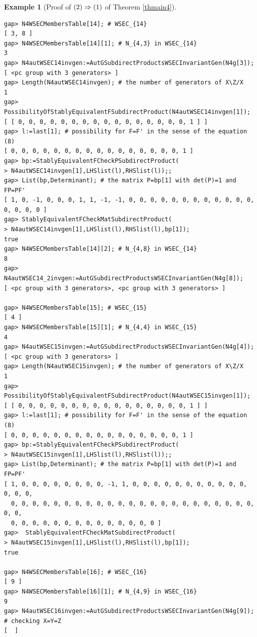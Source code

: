 \documentclass{amsart}
\theoremstyle{plain}
\theoremstyle{definition}
\newtheorem{example}[theorem]{Example}
\theoremstyle{remark}
\begin{document}
\begin{example}[Proof of ${\rm (2)}\Rightarrow {\rm (1)}$ of {Theorem \ref{thmain4}}]
\begin{verbatim}
gap> N4WSECMembersTable[14]; # WSEC_{14}
[ 3, 8 ]
gap> N4WSECMembersTable[14][1]; # N_{4,3} in WSEC_{14}
3
gap> N4autWSEC14invgen:=AutGSubdirectProductsWSECInvariantGen(N4g[3]);
[ <pc group with 3 generators> ]
gap> Length(N4autWSEC14invgen); # the number of generators of X\Z/X
1
gap> PossibilityOfStablyEquivalentFSubdirectProduct(N4autWSEC14invgen[1]);
[ [ 0, 0, 0, 0, 0, 0, 0, 0, 0, 0, 0, 0, 0, 0, 0, 0, 1 ] ]
gap> l:=last[1]; # possibility for F=F' in the sense of the equation (8)
[ 0, 0, 0, 0, 0, 0, 0, 0, 0, 0, 0, 0, 0, 0, 0, 0, 1 ]
gap> bp:=StablyEquivalentFCheckPSubdirectProduct(
> N4autWSEC14invgen[1],LHSlist(l),RHSlist(l));;
gap> List(bp,Determinant); # the matrix P=bp[1] with det(P)=1 and FP=PF'
[ 1, 0, -1, 0, 0, 0, 1, 1, -1, -1, 0, 0, 0, 0, 0, 0, 0, 0, 0, 0, 0, 0, 0, 0, 0, 0 ]
gap> StablyEquivalentFCheckMatSubdirectProduct(
> N4autWSEC14invgen[1],LHSlist(l),RHSlist(l),bp[1]);
true
gap> N4WSECMembersTable[14][2]; # N_{4,8} in WSEC_{14}
8
gap> N4autWSEC14_2invgen:=AutGSubdirectProductsWSECInvariantGen(N4g[8]);
[ <pc group with 3 generators>, <pc group with 3 generators> ]

gap> N4WSECMembersTable[15]; # WSEC_{15}
[ 4 ]
gap> N4WSECMembersTable[15][1]; # N_{4,4} in WSEC_{15}
4
gap> N4autWSEC15invgen:=AutGSubdirectProductsWSECInvariantGen(N4g[4]);
[ <pc group with 3 generators> ]
gap> Length(N4autWSEC15invgen); # the number of generators of X\Z/X
1
gap> PossibilityOfStablyEquivalentFSubdirectProduct(N4autWSEC15invgen[1]);
[ [ 0, 0, 0, 0, 0, 0, 0, 0, 0, 0, 0, 0, 0, 0, 0, 0, 1 ] ]
gap> l:=last[1]; # possibility for F=F' in the sense of the equation (8)
[ 0, 0, 0, 0, 0, 0, 0, 0, 0, 0, 0, 0, 0, 0, 0, 0, 1 ]
gap> bp:=StablyEquivalentFCheckPSubdirectProduct(
> N4autWSEC15invgen[1],LHSlist(l),RHSlist(l));;
gap> List(bp,Determinant); # the matrix P=bp[1] with det(P)=1 and FP=PF' 
[ 1, 0, 0, 0, 0, 0, 0, 0, 0, -1, 1, 0, 0, 0, 0, 0, 0, 0, 0, 0, 0, 0, 0, 0, 0, 
  0, 0, 0, 0, 0, 0, 0, 0, 0, 0, 0, 0, 0, 0, 0, 0, 0, 0, 0, 0, 0, 0, 0, 0, 0, 
  0, 0, 0, 0, 0, 0, 0, 0, 0, 0, 0, 0, 0, 0 ]
gap>  StablyEquivalentFCheckMatSubdirectProduct(
> N4autWSEC15invgen[1],LHSlist(l),RHSlist(l),bp[1]);
true

gap> N4WSECMembersTable[16]; # WSEC_{16}
[ 9 ]
gap> N4WSECMembersTable[16][1]; # N_{4,9} in WSEC_{16}
9
gap> N4autWSEC16invgen:=AutGSubdirectProductsWSECInvariantGen(N4g[9]); # checking X=Y=Z
[  ]


\end{verbatim}
\end{example}
\end{document}
